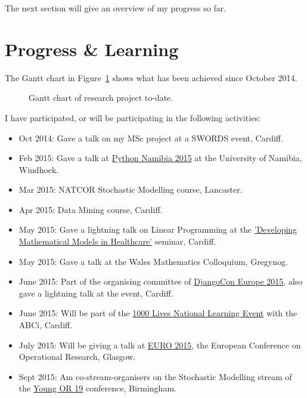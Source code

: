 \documentclass{article}
\begin{document}
The next section will give an overview of my progress so far.

\section{Progress \& Learning}

The Gantt chart in Figure~\ref{fig:progressgantt} shows what has been achieved
since October 2014.

\begin{figure}
    
    \caption{Gantt chart of research project to-date.}
    \label{fig:progressgantt}
\end{figure}

I have participated, or will be participating in the following activities:
\begin{itemize}
    \item Oct 2014: Gave a talk on my MSc project at a SWORDS event, Cardiff.
    \item Feb 2015: Gave a talk at \href{http://python-namibia.org}{Python Namibia 2015} at the University of Namibia, Windhoek.
    \item Mar 2015: NATCOR Stochastic Modelling course, Lancaster.
    \item Apr 2015: Data Mining course, Cardiff.
    \item May 2015: Gave a lightning talk on Linear Programming at the \href{http://www.youtube.com/watch?v=2NMp6WsK-QI&t=67m14s}{'Developing Mathematical Models in Healthcare'} seminar, Cardiff.
    \item May 2015: Gave a talk at the Wales Mathematics Colloquium, Gregynog.
    \item June 2015: Part of the organising committee of \href{http://2015.djangocon.eu}{DjangoCon Europe 2015}, also gave a lightning talk at the event, Cardiff.
    \item June 2015: Will be part of the \href{https://www.eventsforce.net/NLIAH/media/uploaded/EVNLIAH/event_697/1000%20Lives%20Improvement%20National%20Learning%20Event%20-%2017%20June%202015%20-%20AGENDA%20(1)%20(DRAFT).pdf}{1000 Lives National Learning Event} with the ABCi, Cardiff.
    \item July 2015: Will be giving a talk at \href{http://www.euro2015.org}{EURO 2015}, the European Conference on Operational Research, Glasgow.
    \item Sept 2015: Am co-stream-organisers on the Stochastic Modelling stream of the \href{http://www.theorsociety.com/yor19}{Young OR 19} conference, Birmingham.
\end{itemize}
\end{document}
